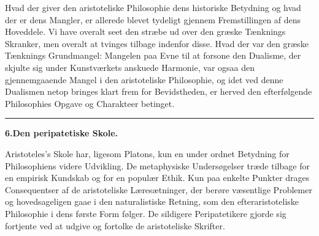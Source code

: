 \documentclass[12pt,a4paper]{book}
\newcommand{\divrule}{\begin{center}\rule{2cm}{0.4pt}\end{center}}
\begin{document}
Hvad der giver den aristoteliske Philosophie dens historiske
Betydning og hvad der er dens Mangler, er allerede blevet
tydeligt gjennem Fremstillingen af dens Hoveddele. Vi have
overalt seet den stræbe ud over den græske Tænknings Skranker,
men overalt at tvinges tilbage indenfor disse. Hvad der var
den græske Tænknings Grundmangel: Mangelen paa Evne til
at forsone den Dualisme, der skjulte sig under Kunstværkets
anskuede Harmonie, var ogsaa den gjennemgaaende Mangel i
den aristoteliske Philosophie, og idet ved denne Dualismen
netop bringes klart frem for Bevidstheden, er herved den
efterfølgende Philosophies Opgave og Charakteer betinget.
\divrule
\begin{center}
\textbf{6.\enspace Den peripatetiske Skole.}
\end{center}
Aristoteles's Skole har, ligesom Platons, kun en under\-%
ordnet Betydning for Philosophiens videre Udvikling. De
metaphysiske Undersøgelser træde tilbage for en empirisk
Kundskab og for en populær Ethik. Kun paa enkelte Punkter
drages Consequentser af de aristoteliske Læresætninger, der
berøre væsentlige Problemer og hovedsageligen gaae i den
naturalistiske Retning, som den efteraristoteliske Philosophie i
dens første Form følger. De sildigere Peripatetikere gjorde sig
fortjente ved at udgive og fortolke de aristoteliske Skrifter.
\end{document}
